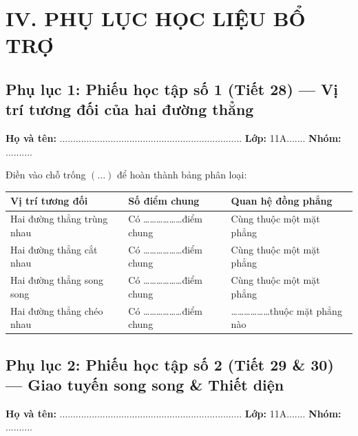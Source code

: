 \documentclass[12pt, a4paper]{article}
\begin{document}
\newpage

\section*{IV. PHỤ LỤC HỌC LIỆU BỔ TRỢ}

\subsection*{Phụ lục 1: Phiếu học tập số 1 (Tiết 28) --- Vị trí tương đối của hai đường thẳng}
\noindent\textbf{Họ và tên:} .................................................................... \textbf{Lớp:} 11A....... \textbf{Nhóm:} ..........

\begin{pedabox}
Điền vào chỗ trống $(\dots)$ để hoàn thành bảng phân loại:
\begin{center}
\begin{tabularx}{0.95\linewidth}{|p{3.5cm}|X|X|}
\hline
\textbf{Vị trí tương đối} & \textbf{Số điểm chung} & \textbf{Quan hệ đồng phẳng} \\
\hline
Hai đường thẳng trùng nhau & Có \dots\dots\dots\dots\dots\dots điểm chung & Cùng thuộc một mặt phẳng \\
\hline
Hai đường thẳng cắt nhau & Có \dots\dots\dots\dots\dots\dots điểm chung & Cùng thuộc một mặt phẳng \\
\hline
Hai đường thẳng song song & Có \dots\dots\dots\dots\dots\dots điểm chung & Cùng thuộc một mặt phẳng \\
\hline
Hai đường thẳng chéo nhau & Có \dots\dots\dots\dots\dots\dots điểm chung & \dots\dots\dots\dots\dots\dots thuộc mặt phẳng nào \\
\hline
\end{tabularx}
\end{center}
\end{pedabox}

\subsection*{Phụ lục 2: Phiếu học tập số 2 (Tiết 29 \& 30) --- Giao tuyến song song \& Thiết diện}
\noindent\textbf{Họ và tên:} .................................................................... \textbf{Lớp:} 11A....... \textbf{Nhóm:} ..........
\end{document}
